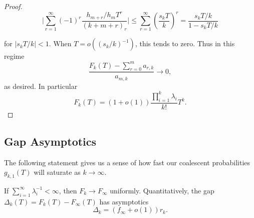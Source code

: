 \begin{subappendices}
\begin{proof}
\[\bigg|\sum_{r=1}^\infty (-1)^r\frac{h_{m+r}/h_mT^r}{(k+m+r)_r}\bigg| \leq \sum_{r=1}^\infty \left(\frac{s_kT}{k}\right)^r = \frac{s_kT/k}{1 - s_k T/k}\]

\noindent for $|s_kT/k| < 1$. When $T = o((s_k/k)^{-1})$, this tends to zero.  Thus in this regime
%
\[\frac{F_k(T) - \sum_{r=0}^{m} a_{r,k}}{a_{m, k}} \to 0,\]
%
 \noindent as desired. In particular
%
\[F_k(T) = (1 + o(1)) \frac{\prod_{i=1}^k \lambda_i}{k!} T^{k}.\]
%
\end{proof}

\subsection{Gap Asymptotics}
\label{app:gap-asymptotics}

\noindent The following statement gives us a sense of how fast our coalescent probabilities $g_{k,1}(T)$ will saturate as $k \to \infty$.

\begin{theorem} If $\sum_{i=1}^\infty \lambda_i^{-1} < \infty$, then $F_k \to F_\infty$ uniformly. Quantitatively, the gap $\Delta_k(T) = F_{k}(T) - F_\infty(T)$ has asymptotics
        \[\Delta_k = (f_\infty + o(1))r_k.\]
\end{theorem}


\end{subappendices}
